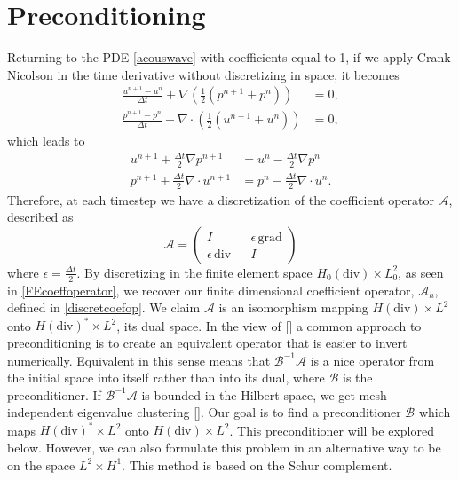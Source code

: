 \documentclass[11pt]{article}
\newcommand{\divv}{\mathrm{div}}
\newcommand{\gradd}{\mathrm{grad}}
\begin{document}
\section{Preconditioning}
Returning to the PDE \eqref{acouswave} with coefficients equal to 1, if we apply Crank Nicolson in the time derivative without discretizing in space, it becomes
\begin{equation}
\begin{split}
\frac{u^{n+1}-u^n}{\Delta t} + \nabla \left( \frac{1}{2}\left( p^{n+1} + p^n \right) \right) &= 0,\\
\frac{p^{n+1} -p^n}{\Delta t} + \nabla \cdot \left( \frac{1}{2} \left( u^{n+1}+u^n \right)\right) &=0,
\end{split}
\end{equation}
which leads to
\begin{equation}
\begin{split}
u^{n+1} + \frac{\Delta t}{2}\nabla p^{n+1} &= u^n - \frac{\Delta t}{2}\nabla p^n\\
p^{n+1} + \frac{\Delta t}{2}\nabla \cdot u^{n+1} &= p^n - \frac{\Delta t}{2}\nabla \cdot u^n.
\end{split}
\end{equation}
Therefore, at each timestep we have a discretization of the coefficient operator $\mathscr{A}$, described as
\begin{equation}
\mathscr{A} = \begin{pmatrix}
I && \epsilon\,\gradd \\
\epsilon\,\divv && I
\end{pmatrix}
\end{equation} %
where $\epsilon = \frac{\Delta t}{2}$.  By discretizing in the finite element space $H_0(\divv) \times L_0^2$, as seen in \eqref{FEcoeffoperator}, we recover our finite dimensional coefficient operator, $\mathscr{A}_h$, defined in \eqref{discretcoefop}.
We claim $\mathscr{A}$ is an isomorphism mapping  $H(\divv) \times L^2$ onto $H(\divv)^*\times L^2$, its dual space. In the view of [] a common approach to preconditioning is to create an equivalent operator that is easier to invert numerically. Equivalent in this sense means that $\mathscr{B}^{-1}\mathscr{A}$ is a nice operator from the initial space into itself rather than into its dual, where $\mathscr{B}$ is the preconditioner. If $\mathscr{B}^{-1}\mathscr{A}$ is bounded in the Hilbert space, we get mesh independent eigenvalue clustering []. Our goal is to find a preconditioner $\mathscr{B}$ which maps $H(\divv)^* \times L^2$ onto $H(\divv) \times L^2$. This preconditioner will be explored below. However, we can also formulate this problem in an alternative way to be on the space $L^2 \times H^1$. This method is based on the Schur complement.
\end{document}
